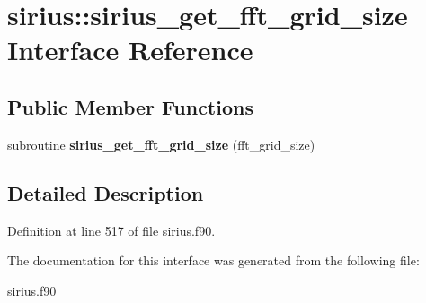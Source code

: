 \hypertarget{interfacesirius_1_1sirius__get__fft__grid__size}{}\section{sirius\+:\+:sirius\+\_\+get\+\_\+fft\+\_\+grid\+\_\+size Interface Reference}
\label{interfacesirius_1_1sirius__get__fft__grid__size}
\subsection*{Public Member Functions}
\begin{DoxyCompactItemize}
\item 
\hypertarget{interfacesirius_1_1sirius__get__fft__grid__size_ae5cbcbb76ec9980594aea64d9e47703e}{}subroutine {\bfseries sirius\+\_\+get\+\_\+fft\+\_\+grid\+\_\+size} (fft\+\_\+grid\+\_\+size)\label{interfacesirius_1_1sirius__get__fft__grid__size_ae5cbcbb76ec9980594aea64d9e47703e}

\end{DoxyCompactItemize}


\subsection{Detailed Description}


Definition at line 517 of file sirius.\+f90.



The documentation for this interface was generated from the following file\+:\begin{DoxyCompactItemize}
\item 
sirius.\+f90\end{DoxyCompactItemize}
